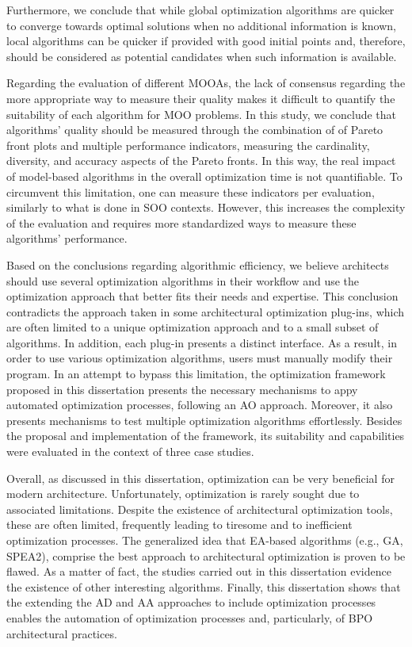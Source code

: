 Furthermore, we conclude that while global optimization algorithms are quicker to converge towards optimal solutions when no additional information is known, local algorithms can be quicker if provided with good initial points and, therefore, should be considered as potential candidates when such information is available.

Regarding the evaluation of different \acp{MOOA}, the lack of consensus regarding the more appropriate way to measure their quality makes it difficult to quantify the suitability of each algorithm for \ac{MOO} problems. In this study, we conclude that algorithms' quality should be measured through the combination of of Pareto front plots and multiple performance indicators, measuring the cardinality, diversity, and accuracy aspects of the Pareto fronts. In this way, the real impact of model-based algorithms in the overall optimization time is not quantifiable. To circumvent this limitation, one can measure these indicators per evaluation, similarly to what is done in \ac{SOO} contexts. However, this increases the complexity of the evaluation and requires more standardized ways to measure these algorithms' performance.
 
Based on the conclusions regarding algorithmic efficiency, we believe architects should use several optimization algorithms in their workflow and use the optimization approach that better fits their needs and expertise. This conclusion contradicts the approach taken in some architectural optimization plug-ins, which are often limited to a unique optimization approach and to a small subset of algorithms. In addition, each plug-in presents a distinct interface. As a result, in order to use various optimization algorithms, users must manually modify their program. In an attempt to bypass this limitation, the optimization framework proposed in this dissertation presents the necessary mechanisms to appy automated optimization processes, following an \ac{AO} approach. Moreover, it also presents mechanisms to test multiple optimization algorithms effortlessly. Besides the proposal and implementation of the framework, its suitability and capabilities were evaluated in the context of three case studies.

Overall, as discussed in this dissertation, optimization can be very beneficial for modern architecture. Unfortunately, optimization is rarely sought due to associated limitations. Despite the existence of architectural optimization tools, these are often limited, frequently leading to tiresome and to inefficient optimization processes. The generalized idea that \ac{EA}-based algorithms (e.g., \ac{GA}, \ac{SPEA2}), comprise the best approach to architectural optimization is proven to be flawed. As a matter of fact, the studies carried out in this dissertation evidence the existence of other interesting algorithms. Finally, this dissertation shows that the extending the \ac{AD} and \ac{AA} approaches to include optimization processes enables the automation of optimization processes and, particularly, of \ac{BPO} architectural practices. 
	
